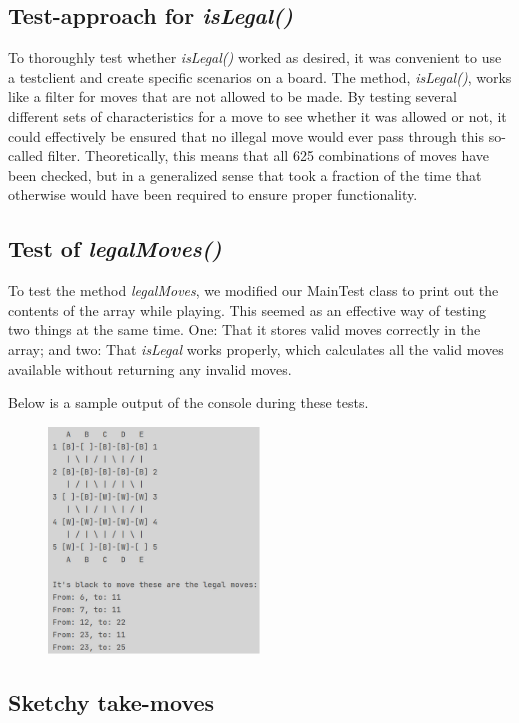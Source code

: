 \documentclass[12pt, a4paper]{article}
\begin{document}
\subsection{Test-approach for \emph{isLegal()}}
To thoroughly test whether \emph{isLegal()} worked as desired, it was convenient to use a testclient and create specific scenarios on a board. The method, \emph{isLegal()}, works like a filter for moves that are not allowed to be made. By testing several different sets of characteristics for a move to see whether it was allowed or not, it could effectively be ensured that no illegal move would ever pass through this so-called filter. Theoretically, this means that all 625 combinations of moves have been checked, but in a generalized sense that took a fraction of the time that otherwise would have been required to ensure proper functionality.

\subsection{Test of \emph{legalMoves()}}
To test the method \emph{legalMoves}, we modified our MainTest class to print out the contents of the array while playing. This seemed as an effective way of testing two things at the same time. One: That it stores valid moves correctly in the array; and two: That \emph{isLegal} works properly, which calculates all the valid moves available without returning any invalid moves. \par
Below is a sample output of the console during these tests.

\begin{figure}[h]
	\centering
	\includegraphics[width=0.5\textwidth]{isLegalprint.png}		
\end{figure}

\subsection{Sketchy take-moves}
\end{document}
